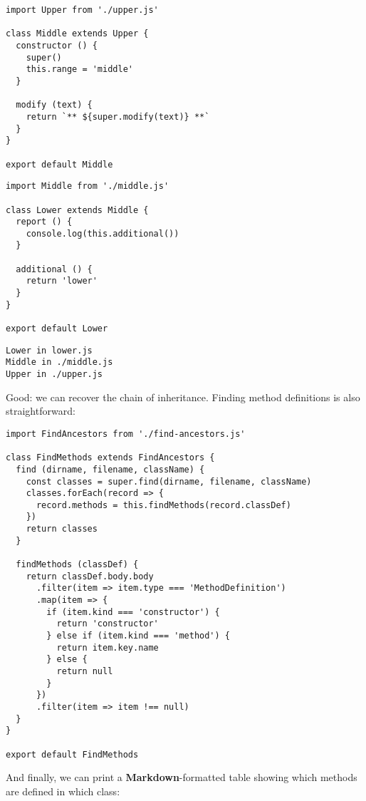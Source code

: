 \documentclass[krantzl]{krantz}
\newcommand{\glossref}[1]{\textbf{#1}}
\begin{document}
\begin{lstlisting}[frame=tblr]
import Upper from './upper.js'

class Middle extends Upper {
  constructor () {
    super()
    this.range = 'middle'
  }

  modify (text) {
    return `** ${super.modify(text)} **`
  }
}

export default Middle
\end{lstlisting}



\begin{lstlisting}[frame=tblr]
import Middle from './middle.js'

class Lower extends Middle {
  report () {
    console.log(this.additional())
  }

  additional () {
    return 'lower'
  }
}

export default Lower
\end{lstlisting}



\begin{lstlisting}[frame=tblr,backgroundcolor=\color{black!5}]
Lower in lower.js
Middle in ./middle.js
Upper in ./upper.js
\end{lstlisting}



Good: we can recover the chain of inheritance.
Finding method definitions is also straightforward:


\begin{lstlisting}[frame=tblr]
import FindAncestors from './find-ancestors.js'

class FindMethods extends FindAncestors {
  find (dirname, filename, className) {
    const classes = super.find(dirname, filename, className)
    classes.forEach(record => {
      record.methods = this.findMethods(record.classDef)
    })
    return classes
  }

  findMethods (classDef) {
    return classDef.body.body
      .filter(item => item.type === 'MethodDefinition')
      .map(item => {
        if (item.kind === 'constructor') {
          return 'constructor'
        } else if (item.kind === 'method') {
          return item.key.name
        } else {
          return null
        }
      })
      .filter(item => item !== null)
  }
}

export default FindMethods
\end{lstlisting}



And finally,
we can print a \glossref{Markdown}-formatted table
showing which methods are defined in which class:
\end{document}
